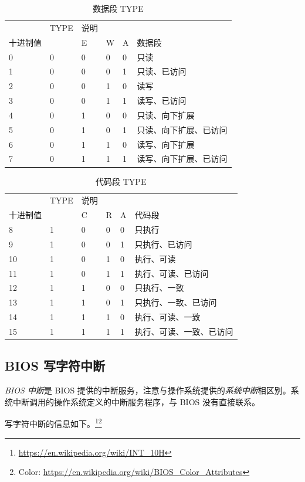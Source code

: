 \begin{table}[]
\caption{数据段 TYPE}
\label{tab:数据段 TYPE}
\begin{tabular}{llllll}
 & TYPE & 说明 &  &  &  \\
十进制值 &  & E & W & A & 数据段 \\
0 & 0 & 0 & 0 & 0 & 只读 \\
1 & 0 & 0 & 0 & 1 & 只读、已访问 \\
2 & 0 & 0 & 1 & 0 & 读写 \\
3 & 0 & 0 & 1 & 1 & 读写、已访问 \\
4 & 0 & 1 & 0 & 0 & 只读、向下扩展 \\
5 & 0 & 1 & 0 & 1 & 只读、向下扩展、已访问 \\
6 & 0 & 1 & 1 & 0 & 读写、向下扩展 \\
7 & 0 & 1 & 1 & 1 & 读写、向下扩展、已访问
\end{tabular}
\end{table}

\begin{table}[]
\caption{代码段 TYPE}
\label{tab:代码段 TYPE}
\begin{tabular}{llllll}
 & TYPE & 说明 &  &  &  \\
十进制值 &  & C & R & A & 代码段 \\
8 & 1 & 0 & 0 & 0 & 只执行 \\
9 & 1 & 0 & 0 & 1 & 只执行、已访问 \\
10 & 1 & 0 & 1 & 0 & 执行、可读 \\
11 & 1 & 0 & 1 & 1 & 执行、可读、已访问 \\
12 & 1 & 1 & 0 & 0 & 只执行、一致 \\
13 & 1 & 1 & 0 & 1 & 只执行、一致、已访问 \\
14 & 1 & 1 & 1 & 0 & 执行、可读、一致 \\
15 & 1 & 1 & 1 & 1 & 执行、可读、一致、已访问
\end{tabular}
\end{table}

\subsection{BIOS 写字符中断}

\textit{BIOS 中断}是 BIOS 提供的中断服务，注意与操作系统提供的\textit{系统中断}相区别。系统中断调用的操作系统定义的中断服务程序，与 BIOS 没有直接联系。

写字符中断的信息如下。\footnote{\url{https://en.wikipedia.org/wiki/INT_10H}}\footnote{Color: \url{https://en.wikipedia.org/wiki/BIOS_Color_Attributes}}

